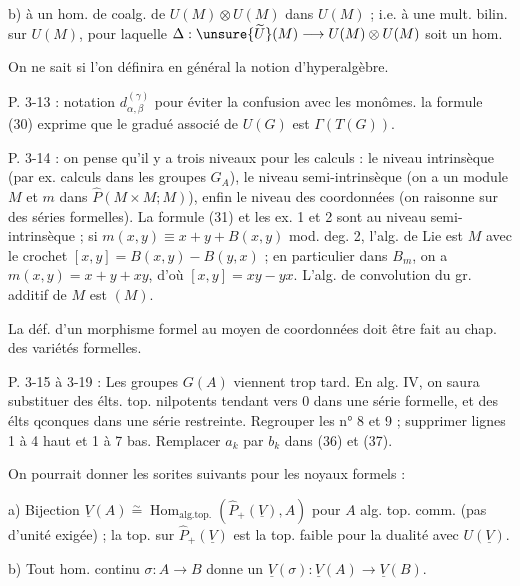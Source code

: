 b) à un hom. de coalg. de $U(M)\otimes U(M)$ dans $U(M)$ ; i.e. à une mult. bilin. sur $U(M)$, pour laquelle $\Delta:\unsure{\widetilde U}(M)\longrightarrow U(M)\otimes U(M)$ soit un hom.

On ne sait si l'on définira en général la notion d'hyperalgèbre.

P. 3-13 : notation $d_{\alpha,\beta}^{(\gamma)}$ pour éviter la confusion avec les monômes. la formule (30) exprime que le gradué associé de $U(G)$ est $\Gamma(T(G))$.

P. 3-14 : on pense qu'il y a trois niveaux pour les calculs : le niveau intrinsèque (par ex. calculs  dans les groupes $G_A$), le niveau semi-intrinsèque (on a un module $M$ et $m$ dans $\widehat P(M\times M;M)$), enfin le niveau des coordonnées (on raisonne sur des séries formelles). La formule (31) et les ex. 1 et 2 sont au niveau semi-intrinsèque ; si $m(x,y)\equiv x+y+B(x,y)$ mod. deg. 2, l'alg. de Lie est $M$ avec le crochet $[x,y]=B(x,y)-B(y,x)$ ; en particulier dans $B_m$, on a $m(x,y)=x+y+xy$, d'où $[x,y]=xy-yx$. L'alg. de convolution du gr. additif de $M$ est $(M)$.

La déf. d'un morphisme formel au moyen de coordonnées doit être fait au chap. des variétés formelles.


P. 3-15 à 3-19 : Les groupes $G(A)$ viennent trop tard. En alg. IV, on saura substituer des élts. top. nilpotents tendant vers 0 dans une série formelle, et des élts qconques dans une série restreinte. Regrouper les n° 8 et 9 ; supprimer lignes 1 à 4 haut et 1 à 7 bas. Remplacer $a_k$ par $b_k$ dans (36) et (37).

On pourrait donner les sorites suivants pour les noyaux formels :

a) Bijection $\underline V(A)\overset{\sim}{=}\operatorname{Hom}_{\mathrm{alg.top.}}(\widehat P_+(\underline V),A)$ pour $A$ alg. top. comm. (pas d'unité exigée) ; la top. sur $\widehat P_+(\underline V)$ est la top. faible pour la dualité avec $U(\underline V)$.

b) Tout hom. continu $\sigma:A\longrightarrow B$ donne un $\underline V(\sigma):\underline V(A)\longrightarrow\underline V(B)$.

